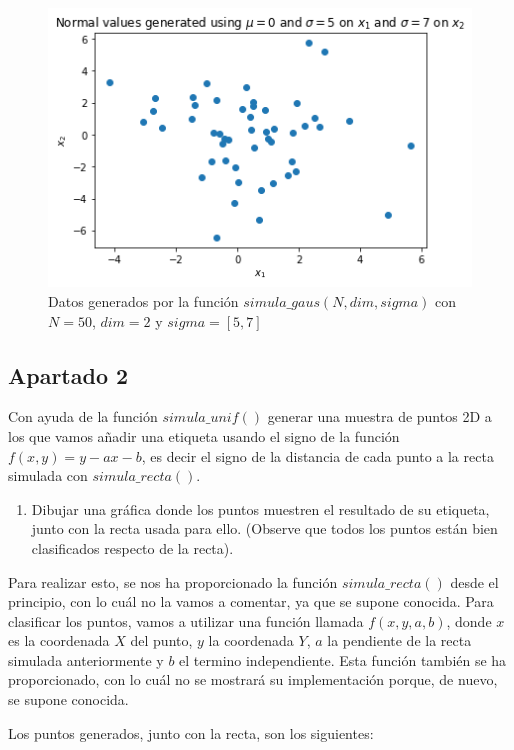 \documentclass[11pt,a4paper]{article}
\begin{document}
\begin{figure}[H]
\centering
\includegraphics[scale=0.6]{img/simula_gaus.png}
\caption{Datos generados por la función $simula\_gaus(N, dim, sigma)$ con $N = 50$, $dim = 2$ y
$sigma = [5, 7]$}
\end{figure}

\subsection*{Apartado 2}

\noindent Con ayuda de la función $simula\_unif()$ generar una muestra de puntos 2D a los
que vamos añadir una etiqueta usando el signo de la función $f(x, y) = y - ax - b$, es decir
el signo de la distancia de cada punto a la recta simulada con $simula\_recta()$.

\begin{enumerate}[label=\textit{\alph*})]
	\item Dibujar una gráfica donde los puntos muestren el resultado de su etiqueta, junto
	con la recta usada para ello. (Observe que todos los puntos están bien clasificados
	respecto de la recta).
\end{enumerate}

Para realizar esto, se nos ha proporcionado la función $simula\_recta()$ desde el principio, con lo
cuál no la vamos a comentar, ya que se supone conocida. Para clasificar los puntos, vamos a utilizar
una función llamada $f(x, y, a, b)$, donde $x$ es la coordenada $X$ del punto, $y$ la coordenada $Y$,
$a$ la pendiente de la recta simulada anteriormente y $b$ el termino independiente. Esta función
también se ha proporcionado, con lo cuál no se mostrará su implementación porque, de nuevo, se supone
conocida.

Los puntos generados, junto con la recta, son los siguientes:
\end{document}
